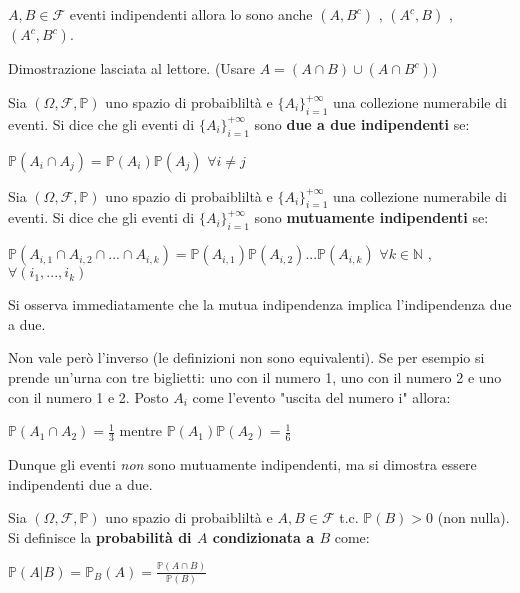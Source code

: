 \begin{proposition}
    $A,B\in\mathscr{F}$ eventi indipendenti allora lo sono anche $(A,B^c)$ , $(A^c,B)$ , $(A^c,B^c)$.
\end{proposition}

Dimostrazione lasciata al lettore. (Usare $A=(A\cap B)\cup(A\cap B^c)$)


\begin{definition}
    Sia $(\Omega,\mathscr{F},\mathbb{P})$ uno spazio di probaibliltà e $\{{A_i}\}_{i=1}^{+\infty}$ una collezione numerabile di eventi. Si dice che gli eventi di $\{{A_i}\}_{i=1}^{+\infty}$ sono \textbf{due a due indipendenti} se:
    \begin{center}
        $\mathbb{P}(A_i\cap A_j)=\mathbb{P}(A_i)\mathbb{P}(A_j)$ $\forall i\neq j$
    \end{center}
\end{definition}

\begin{definition}
    Sia $(\Omega,\mathscr{F},\mathbb{P})$ uno spazio di probaibliltà e $\{{A_i}\}_{i=1}^{+\infty}$ una collezione numerabile di eventi. Si dice che gli eventi di $\{{A_i}\}_{i=1}^{+\infty}$ sono \textbf{mutuamente indipendenti} se:
    \begin{center}
        $\mathbb{P}(A_{i,1}\cap A_{i,2}\cap ...\cap A_{i,k})=\mathbb{P}(A_{i,1})\mathbb{P}(A_{i,2})...\mathbb{P}(A_{i,k})$  $\forall k\in\mathbb{N}$ , $\forall(i_1,...,i_k) $
    \end{center}
\end{definition}

\begin{observation}
    Si osserva immediatamente che la mutua indipendenza implica l'indipendenza due a due.
\end{observation}
\newpage
Non vale però l'inverso (le definizioni non sono equivalenti). Se per esempio si prende un'urna con tre biglietti: uno con il numero 1, uno con il numero 2 e uno con il numero 1 e 2. Posto $A_i$ come l'evento "uscita del numero i" allora:
\begin{center}
    $\mathbb{P}(A_1\cap A_2)=\frac{1}{3}$   mentre    $\mathbb{P}(A_1)\mathbb{P}(A_2)=\frac{1}{6}$
\end{center}
Dunque gli eventi \textit{non} sono mutuamente indipendenti, ma si dimostra essere indipendenti due a due.

\begin{definition}
    Sia $(\Omega,\mathscr{F},\mathbb{P})$ uno spazio di probaibliltà e $A,B\in\mathscr{F}$ t.c. $\mathbb{P}(B)>0$ (non nulla). Si definisce la \textbf{probabilità di $A$ condizionata a $B$} come:
    \begin{center}
        $\mathbb{P}(A | B)=\mathbb{P}_B(A)=$\large$\frac{\mathbb{P}(A\cap B)}{\mathbb{P}(B)}$
    \end{center}
\end{definition}

